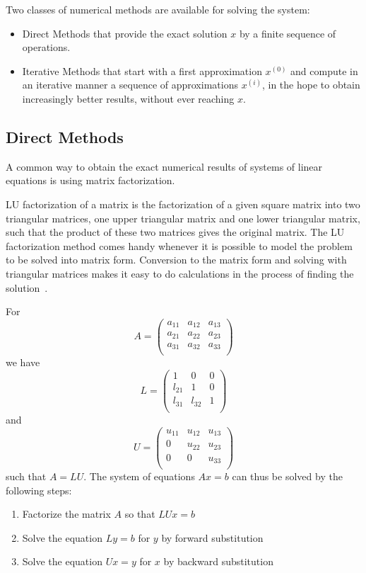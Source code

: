 Two classes of numerical methods are available for solving the system:
\begin{itemize}
    \item Direct Methods that provide the exact solution $x$ by a finite 
        sequence of operations.
    \item Iterative Methods that start with a first approximation $x^{(0)}$ and 
        compute in an iterative manner a sequence of approximations $x^{(i)}$, 
        in the hope to obtain increasingly better results, without ever reaching 
        $x$.
\end{itemize}

\subsection{Direct Methods}
A common way to obtain the exact numerical results of systems of linear 
equations is using matrix factorization.

LU factorization of a matrix is the factorization of a given square matrix into 
two triangular matrices, one upper triangular matrix and one lower triangular 
matrix, such that the product of these two matrices gives the original matrix.  
The LU factorization method comes handy whenever it is possible to model the 
problem to be solved into matrix form. Conversion to the matrix form and solving 
with triangular matrices makes it easy to do calculations in the process of 
finding the solution~\cite{mc, nla}.

For $$ A=
\begin{pmatrix}
    a_{11}&a_{12}&a_{13}\\
    a_{21}&a_{22}&a_{23}\\
    a_{31}&a_{32}&a_{33}\\
\end{pmatrix} $$ we have
$$ L=
\begin{pmatrix}
    1      &  0       &  0  \\
    l_{21} &  1       &  0  \\
    l_{31} &  l_{32}  &  1  \\
\end{pmatrix} $$ and $$ U=
\begin{pmatrix}
    u_{11} &  u_{12}  &  u_{13}  \\
    0 &  u_{22}  &  u_{23}  \\
    0 &  0  &  u_{33}  \\
\end{pmatrix} $$ such that $A = LU$. The system of equations $Ax = b$ can thus 
be solved by the following steps:
\begin{enumerate}
    \item Factorize the matrix $A$ so that $LUx = b$
    \item Solve the equation $Ly = b$ for $y$ by forward substitution
    \item Solve the equation $Ux = y$ for $x$ by backward substitution
\end{enumerate}

